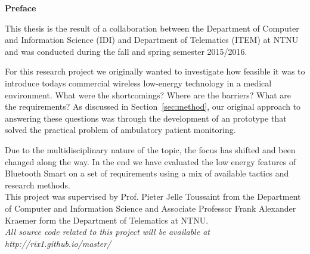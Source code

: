\thispagestyle{empty}
\noindent \textbf{Preface}
\newline

\noindent  
This thesis is the result of a collaboration between the Department of Computer and Information Science (IDI) and Department of Telematics (ITEM) at NTNU and was conducted during the fall and spring semester 2015/2016.

For this research project we originally wanted to investigate how feasible it was to introduce todays commercial wireless low-energy technology in a medical environment. What were the shortcomings? Where are the barriers? What are the requirements? As discussed in Section~\ref{sec:method}, our original approach to answering these questions was through the development of an prototype that solved the practical problem of ambulatory patient monitoring.

Due to the multidisciplinary nature of the topic, the focus has shifted and been changed along the way. In the end we have evaluated the low energy features of Bluetooth Smart on a set of requirements using a mix of available tactics and research methods.
\\
\newline
\noindent
This project was supervised by Prof. Pieter Jelle Toussaint from the Department of Computer and Information Science and Associate Professor Frank Alexander Kraemer form the Department of Telematics at NTNU.
\\
\newline
\noindent
\textit{All source code related to this project will be available at http://rix1.github.io/master/}